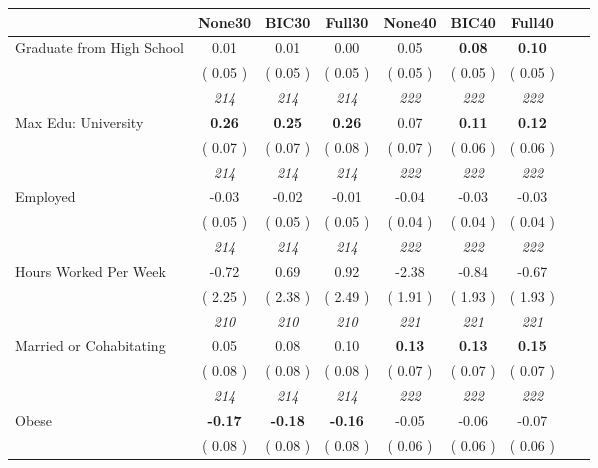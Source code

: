 \begin{tabular}{l c c c c c c c c}
\toprule
 & None30 & BIC30 & Full30 & None40 & BIC40 & Full40 \\
\midrule
Graduate from High School &      0.01 &      0.01 &      0.00 &      0.05 & \textbf{      0.08 } & \textbf{      0.10 } \\
& (     0.05 ) & (     0.05 ) & (     0.05 ) & (     0.05 ) & (     0.05 ) & (     0.05 ) \\
& \textit{ 214 } & \textit{ 214 } & \textit{ 214 } & \textit{ 222 } & \textit{ 222 } & \textit{ 222 } \\
Max Edu: University & \textbf{      0.26 } & \textbf{      0.25 } & \textbf{      0.26 } &      0.07 & \textbf{      0.11 } & \textbf{      0.12 } \\
& (     0.07 ) & (     0.07 ) & (     0.08 ) & (     0.07 ) & (     0.06 ) & (     0.06 ) \\
& \textit{ 214 } & \textit{ 214 } & \textit{ 214 } & \textit{ 222 } & \textit{ 222 } & \textit{ 222 } \\
Employed &     -0.03 &     -0.02 &     -0.01 &     -0.04 &     -0.03 &     -0.03 \\
& (     0.05 ) & (     0.05 ) & (     0.05 ) & (     0.04 ) & (     0.04 ) & (     0.04 ) \\
& \textit{ 214 } & \textit{ 214 } & \textit{ 214 } & \textit{ 222 } & \textit{ 222 } & \textit{ 222 } \\
Hours Worked Per Week &     -0.72 &      0.69 &      0.92 &     -2.38 &     -0.84 &     -0.67 \\
& (     2.25 ) & (     2.38 ) & (     2.49 ) & (     1.91 ) & (     1.93 ) & (     1.93 ) \\
& \textit{ 210 } & \textit{ 210 } & \textit{ 210 } & \textit{ 221 } & \textit{ 221 } & \textit{ 221 } \\
Married or Cohabitating &      0.05 &      0.08 &      0.10 & \textbf{      0.13 } & \textbf{      0.13 } & \textbf{      0.15 } \\
& (     0.08 ) & (     0.08 ) & (     0.08 ) & (     0.07 ) & (     0.07 ) & (     0.07 ) \\
& \textit{ 214 } & \textit{ 214 } & \textit{ 214 } & \textit{ 222 } & \textit{ 222 } & \textit{ 222 } \\
Obese & \textbf{     -0.17 } & \textbf{     -0.18 } & \textbf{     -0.16 } &     -0.05 &     -0.06 &     -0.07 \\
& (     0.08 ) & (     0.08 ) & (     0.08 ) & (     0.06 ) & (     0.06 ) & (     0.06 ) \\

\end{tabular}
